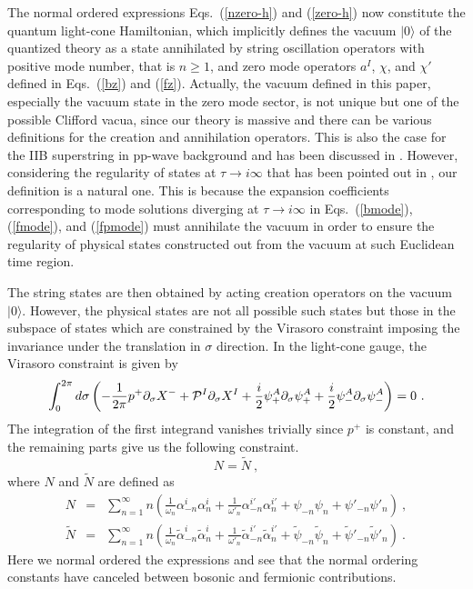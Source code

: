 \documentclass[a4paper,12pt]{article}
\begin{document}
The normal ordered expressions Eqs.~(\ref{nzero-h}) and (\ref{zero-h})
now constitute the quantum light-cone Hamiltonian, which implicitly
defines the vacuum $|0 \rangle$ of the quantized theory as a state
annihilated by string oscillation operators with positive mode number,
that is $n \ge 1$, and zero mode operators $a^I$, $\chi$, and $\chi'$
defined in Eqs.~(\ref{bz}) and (\ref{fz}).  Actually, the vacuum
defined in this paper, especially the vacuum state in the zero mode
sector, is not unique but one of the possible Clifford vacua, since
our theory is massive and there can be various definitions for the
creation and annihilation operators.  This is also the case for the
IIB superstring in pp-wave background and has been discussed in
\cite{met109}.  However, considering the regularity of states at $\tau
\rightarrow i \infty$ that has been pointed out in \cite{rus179}, our
definition is a natural one. This is because the expansion
coefficients corresponding to mode solutions diverging at $\tau
\rightarrow i \infty$ in Eqs.~(\ref{bmode}), (\ref{fmode}), and
(\ref{fpmode}) must annihilate the vacuum in order to ensure the
regularity of physical states constructed out from the vacuum at such
Euclidean time region.

The string states are then obtained by acting creation operators on
the vacuum $| 0 \rangle$.  However, the physical states are not all
possible such states but those in the subspace of states which are
constrained by the Virasoro constraint imposing the invariance under
the translation in $\sigma$ direction.  In the light-cone gauge, 
the Virasoro constraint is given by
\begin{equation}
\int^{2\pi}_0 d \sigma 
 \left( - \frac{1}{2\pi} p^+ \partial_\sigma X^-
   + {\cal P}^I \partial_\sigma X^I
   + \frac{i}{2} \psi^A_+ \partial_\sigma \psi^A_+
   + \frac{i}{2} \psi^A_- \partial_\sigma \psi^A_-
 \right) = 0 ~.
\label{vira}
\end{equation}
The integration of the first integrand vanishes trivially since $p^+$
is constant, and the remaining parts give us the following constraint.
\begin{equation}
N = \tilde{N} ~,
\end{equation}
where $N$ and $\tilde{N}$ are defined as
\begin{eqnarray}
N &=& \sum^\infty_{n=1} n 
   \left( \frac{1}{\omega_n} \alpha^i_{-n} \alpha^i_n
         +\frac{1}{\omega'_n} \alpha^{i'}_{-n} \alpha^{i'}_n
         + \psi_{-n} \psi_n + \psi'_{-n} \psi'_n
   \right) ~,
  \nonumber \\
\tilde{N}
  &=&\sum^\infty_{n=1} n
   \left( \frac{1}{\omega_n} \tilde{\alpha}^i_{-n} 
                             \tilde{\alpha}^i_n
         +\frac{1}{\omega'_n} \tilde{\alpha}^{i'}_{-n} 
                              \tilde{\alpha}^{i'}_n
         + \tilde{\psi}_{-n} \tilde{\psi}_n 
         + \tilde{\psi}'_{-n} \tilde{\psi}'_n
   \right) ~.
\end{eqnarray}
Here we normal ordered the expressions and see that the normal
ordering constants have canceled between bosonic and fermionic
contributions.
\end{document}
